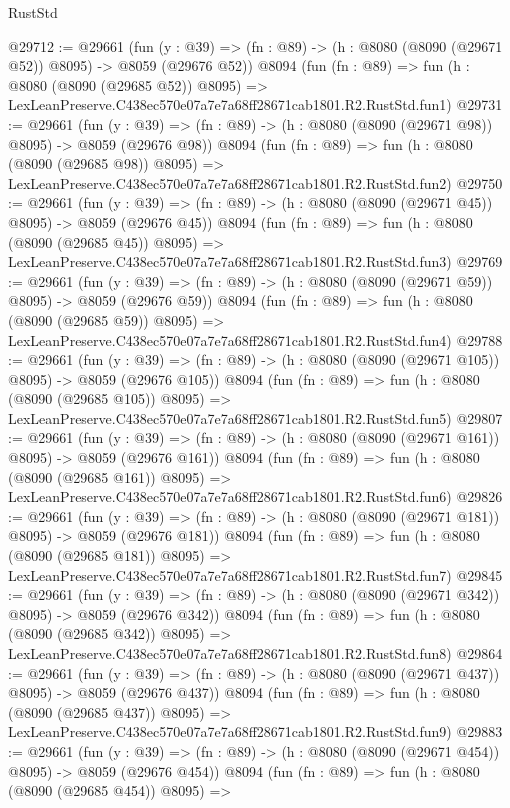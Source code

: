 \begin{lexlean}{RustStd}
\begin{coremodule}
@29712 := @29661
    (fun (y : @39) => (fn : @89) -> (h : @8080 (@8090 (@29671 @52)) @8095) -> @8059 (@29676 @52))
    @8094
    (fun (fn : @89) =>
    fun (h : @8080 (@8090 (@29685 @52)) @8095) =>
    LexLeanPreserve.C438ec570e07a7e7a68ff28671cab1801.R2.RustStd.fun1)
@29731 := @29661
    (fun (y : @39) => (fn : @89) -> (h : @8080 (@8090 (@29671 @98)) @8095) -> @8059 (@29676 @98))
    @8094
    (fun (fn : @89) =>
    fun (h : @8080 (@8090 (@29685 @98)) @8095) =>
    LexLeanPreserve.C438ec570e07a7e7a68ff28671cab1801.R2.RustStd.fun2)
@29750 := @29661
    (fun (y : @39) => (fn : @89) -> (h : @8080 (@8090 (@29671 @45)) @8095) -> @8059 (@29676 @45))
    @8094
    (fun (fn : @89) =>
    fun (h : @8080 (@8090 (@29685 @45)) @8095) =>
    LexLeanPreserve.C438ec570e07a7e7a68ff28671cab1801.R2.RustStd.fun3)
@29769 := @29661
    (fun (y : @39) => (fn : @89) -> (h : @8080 (@8090 (@29671 @59)) @8095) -> @8059 (@29676 @59))
    @8094
    (fun (fn : @89) =>
    fun (h : @8080 (@8090 (@29685 @59)) @8095) =>
    LexLeanPreserve.C438ec570e07a7e7a68ff28671cab1801.R2.RustStd.fun4)
@29788 := @29661
    (fun (y : @39) => (fn : @89) -> (h : @8080 (@8090 (@29671 @105)) @8095) -> @8059 (@29676 @105))
    @8094
    (fun (fn : @89) =>
    fun (h : @8080 (@8090 (@29685 @105)) @8095) =>
    LexLeanPreserve.C438ec570e07a7e7a68ff28671cab1801.R2.RustStd.fun5)
@29807 := @29661
    (fun (y : @39) => (fn : @89) -> (h : @8080 (@8090 (@29671 @161)) @8095) -> @8059 (@29676 @161))
    @8094
    (fun (fn : @89) =>
    fun (h : @8080 (@8090 (@29685 @161)) @8095) =>
    LexLeanPreserve.C438ec570e07a7e7a68ff28671cab1801.R2.RustStd.fun6)
@29826 := @29661
    (fun (y : @39) => (fn : @89) -> (h : @8080 (@8090 (@29671 @181)) @8095) -> @8059 (@29676 @181))
    @8094
    (fun (fn : @89) =>
    fun (h : @8080 (@8090 (@29685 @181)) @8095) =>
    LexLeanPreserve.C438ec570e07a7e7a68ff28671cab1801.R2.RustStd.fun7)
@29845 := @29661
    (fun (y : @39) => (fn : @89) -> (h : @8080 (@8090 (@29671 @342)) @8095) -> @8059 (@29676 @342))
    @8094
    (fun (fn : @89) =>
    fun (h : @8080 (@8090 (@29685 @342)) @8095) =>
    LexLeanPreserve.C438ec570e07a7e7a68ff28671cab1801.R2.RustStd.fun8)
@29864 := @29661
    (fun (y : @39) => (fn : @89) -> (h : @8080 (@8090 (@29671 @437)) @8095) -> @8059 (@29676 @437))
    @8094
    (fun (fn : @89) =>
    fun (h : @8080 (@8090 (@29685 @437)) @8095) =>
    LexLeanPreserve.C438ec570e07a7e7a68ff28671cab1801.R2.RustStd.fun9)
@29883 := @29661
    (fun (y : @39) => (fn : @89) -> (h : @8080 (@8090 (@29671 @454)) @8095) -> @8059 (@29676 @454))
    @8094
    (fun (fn : @89) =>
    fun (h : @8080 (@8090 (@29685 @454)) @8095) =>

\end{coremodule}
\end{lexlean}
